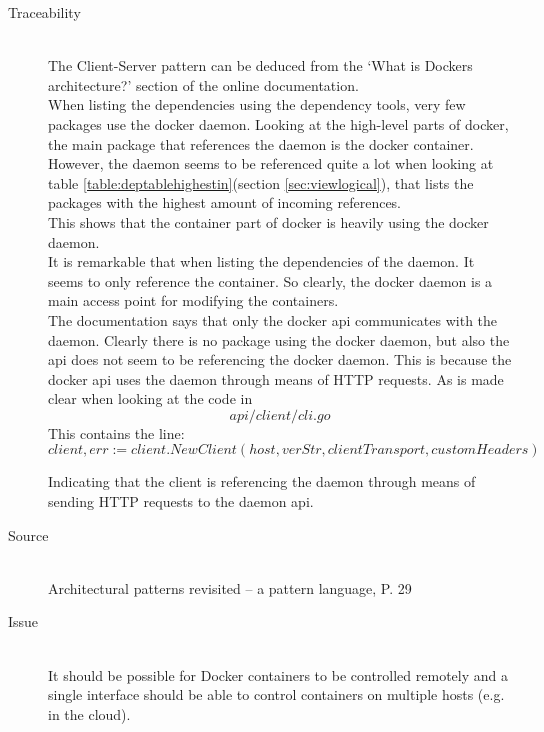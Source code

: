 \begin{description}
\item [Traceability]~\\
The Client-Server pattern can be deduced from the `What is Dockers architecture?' section of the online documentation\cite{dockerarchi}.\\
When listing the dependencies using the dependency tools, very few packages use the docker daemon. Looking at the high-level parts of docker, the main package that references the daemon is the docker container.
However, the daemon seems to be referenced quite a lot when looking at table \ref{table:deptablehighestin}(section \ref{sec:viewlogical}), that lists the packages with the highest amount of incoming references. \\
This shows that the container part of docker is heavily using the docker daemon.\\
It is remarkable that when listing the dependencies of the daemon. It seems to only reference the container. So clearly, the docker daemon is a main access point for modifying the containers.\\
The documentation says that only the docker api communicates with the daemon. Clearly there is no package using the docker daemon, but also the api does not seem to be referencing the docker daemon. This is because the docker api uses the daemon through means of HTTP requests. As is made clear when looking at the code in $$api/client/cli.go$$
This contains the line: 
$$client, err := client.NewClient(host, verStr, clientTransport, customHeaders)$$

Indicating that the client is referencing the daemon through means of sending HTTP requests to the daemon api.


\item [Source]~\\
Architectural patterns revisited -- a pattern language, P. 29 \cite{avgeriou2005architectural}

\item [Issue]~\\
It should be possible for Docker containers to be controlled remotely and a single interface should be able to control containers on multiple hosts (e.g. in the cloud).


\end{description}
